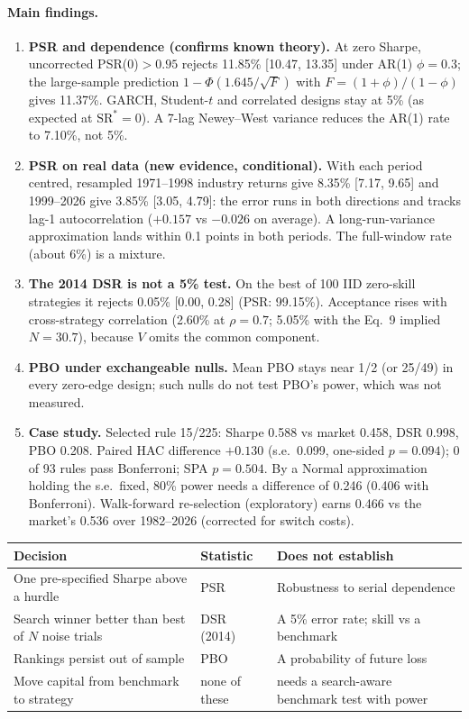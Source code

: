 \documentclass[10pt,a4paper]{article}
\begin{document}
\paragraph{Main findings.}
\begin{enumerate}
\item \textbf{PSR and dependence (confirms known theory).} At zero Sharpe, uncorrected PSR(0)$>0.95$ rejects 11.85\% [10.47, 13.35] under AR(1) $\phi=0.3$; the large-sample prediction $1-\Phi(1.645/\sqrt F)$ with $F=(1+\phi)/(1-\phi)$ gives 11.37\%. GARCH, Student-$t$ and correlated designs stay at 5\% (as expected at $\mathrm{SR}^\ast=0$). A 7-lag Newey--West variance reduces the AR(1) rate to 7.10\%, not 5\%.
\item \textbf{PSR on real data (new evidence, conditional).} With each period centred, resampled 1971--1998 industry returns give 8.35\% [7.17, 9.65] and 1999--2026 give 3.85\% [3.05, 4.79]: the error runs in both directions and tracks lag-1 autocorrelation ($+0.157$ vs $-0.026$ on average). A long-run-variance approximation lands within 0.1 points in both periods. The full-window rate (about 6\%) is a mixture.
\item \textbf{The 2014 DSR is not a 5\% test.} On the best of 100 IID zero-skill strategies it rejects 0.05\% [0.00, 0.28] (PSR: 99.15\%). Acceptance rises with cross-strategy correlation (2.60\% at $\rho=0.7$; 5.05\% with the Eq.~9 implied $N=30.7$), because $V$ omits the common component.
\item \textbf{PBO under exchangeable nulls.} Mean PBO stays near 1/2 (or 25/49) in every zero-edge design; such nulls do not test PBO's power, which was not measured.
\item \textbf{Case study.} Selected rule 15/225: Sharpe 0.588 vs market 0.458, DSR 0.998, PBO 0.208. Paired HAC difference $+0.130$ (s.e.\ 0.099, one-sided $p=0.094$); 0 of 93 rules pass Bonferroni; SPA $p=0.504$. By a Normal approximation holding the s.e.\ fixed, 80\% power needs a difference of 0.246 (0.406 with Bonferroni). Walk-forward re-selection (exploratory) earns 0.466 vs the market's 0.536 over 1982--2026 (corrected for switch costs).
\end{enumerate}

\begin{center}\small
\begin{tabular}{@{}lll@{}}
\toprule
Decision & Statistic & Does not establish \\
\midrule
One pre-specified Sharpe above a hurdle & PSR & Robustness to serial dependence \\
Search winner better than best of $N$ noise trials & DSR (2014) & A 5\% error rate; skill vs a benchmark \\
Rankings persist out of sample & PBO & A probability of future loss \\
Move capital from benchmark to strategy & none of these & needs a search-aware benchmark test with power \\
\bottomrule
\end{tabular}
\end{center}
\end{document}
